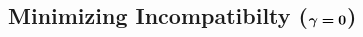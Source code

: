 \documentclass[twoside]{article}
\begin{document}
%


\subsection{%
    Minimizing Incompatibilty
    (\texorpdfstring{$\boldsymbol\gamma\boldsymbol=\mathbf{0}$}{gamma=0})%
} \label{sec:minimize-inc}
\end{document}
